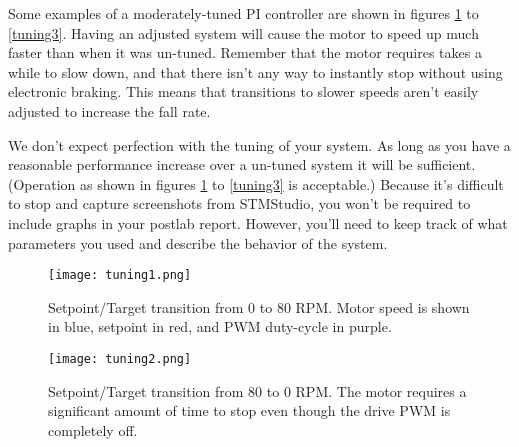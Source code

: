 \documentclass[11pt,fleqn]{book} %
\begin{document}



Some examples of a moderately-tuned PI controller are shown in figures \ref{tuning1} to \ref{tuning3}. Having an adjusted system will cause the motor to speed up much faster than when it was un-tuned. Remember that the motor requires takes a while to slow down, and that there isn't any way to instantly stop without using electronic braking. This means that transitions to slower speeds aren't easily adjusted to increase the fall rate. 




We don't expect perfection with the tuning of your system. As long as you have a reasonable performance increase over a un-tuned system it will be sufficient. (Operation as shown in figures \ref{tuning1} to \ref{tuning3} is acceptable.) Because it's difficult to stop and capture screenshots from STMStudio, you won't be required to include graphs in your postlab report. However, you'll need to keep track of what parameters you used and describe the behavior of the system. 
\begin{figure}[b!]
    \begin{center}
        \hspace*{-3.4cm}
        \texttt{[image: tuning1.png]}
        \caption{Setpoint/Target transition from 0 to 80 RPM. Motor speed is shown in blue, setpoint in red, and PWM duty-cycle in purple. }
        \label{tuning1}
    \end{center}
\end{figure}

\begin{figure}[]
    \begin{center}
        \hspace*{-3.4cm}
        \texttt{[image: tuning2.png]}
        \caption{Setpoint/Target transition from 80 to 0 RPM. The motor requires a significant amount of time to stop even though the drive PWM is completely off. }
        \label{tuning2}
    \end{center}
\end{figure}
\end{document}
